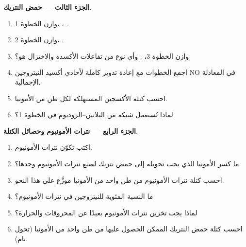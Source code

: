 \begin{problem}
\medskip
\noindent\textbf{الجزء الثالث --- حمض النتريك.}
\begin{enumerate}[resume]
  \item وازن الخطوة 1، ، . %
  \item وازن الخطوة 2، . %
  \item وازن الخطوة 3، . وأي نوع من تفاعلات الأكسدة %
        والاختزال هو؟
  \item اجمع الخطوات مع إعادة تدوير كاملة لأحادي أكسيد النيتروجين NO في المعادلة
        الإجمالية.
  \item احسب كتلة الأكسجين المستهلكة لكل طن من الأمونيا.
  \item لماذا تُستعمل شبكة من البلاتين--الروديوم في الخطوة 1؟
\end{enumerate}

\medskip
\noindent\textbf{الجزء الرابع --- نترات الأمونيوم وحصائل الكتلة.}
\begin{enumerate}[resume]
  \item اكتب تكوّن نترات الأمونيوم.
  \item ما كسر الأمونيا الذي يجب تحويله إلى حمض نتريك
        لصنع نترات الأمونيوم وحدها؟
  \item احسب كتلة نترات الأمونيوم من طن واحد من الأمونيا
        موزَّع على هذا النحو.
  \item ما النسبة المئوية للنيتروجين في نترات الأمونيوم؟
  \item لماذا يجب تخزين نترات الأمونيوم بعيدًا عن المحروقات والحرارة؟
  \item احسب كتلة حمض النتريك الممكن الحصول عليها من طن واحد من
        الأمونيا (تحول تام).
\end{enumerate}
\end{problem}

